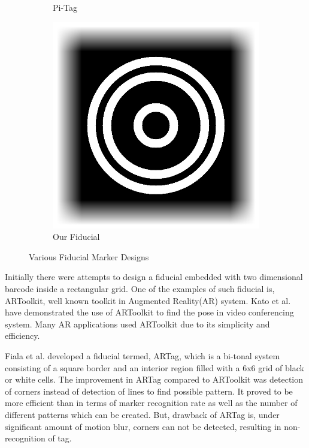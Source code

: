 \documentclass[runningheads]{llncs}
\begin{document}
\begin{figure}
\begin{subfigure}[b]{0.19\textwidth}
  Pi-Tag\cite{Pitag13}
 \end{subfigure}
 \begin{subfigure}[b]{0.19\textwidth}
  \centering
  \includegraphics[width=\linewidth]{our_fiducial}
  Our Fiducial
 \end{subfigure}
 \caption{Various Fiducial Marker Designs}
 \label{fig:previous_work}
\end{figure}

Initially there were attempts to design a fiducial embedded with two
dimensional barcode inside a rectangular grid. One of the examples of such fiducial is,
ARToolkit\cite{ARToolkit02}, well known toolkit in Augmented Reality(AR) system. 
Kato et al.\cite{kato-artoolkit} have demonstrated the use of ARToolkit to find
the pose in video conferencing system. Many AR applications used ARToolkit
due to its simplicity and efficiency. 

Fiala et al. \cite{Fiala05} developed a fiducial termed, ARTag, which is a
bi-tonal system consisting of a square border and an interior region filled
with a 6x6 grid of black or white cells. The improvement in ARTag compared to
ARToolkit was detection of corners instead of detection of lines to find
possible pattern. It proved to be more efficient than \cite{ARToolkit02} in
terms of marker recognition rate as well as the number of different patterns
which can be created. But, drawback of ARTag is, under significant amount of
motion blur, corners can not be detected, resulting in non-recognition of tag.
\end{document}
